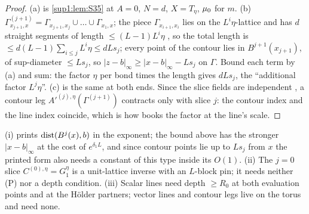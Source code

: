 \begin{proof}
(a) is \cref{sup1:lem:S35} at $A=0$, $N=d$, $X=T_\eta$, $\mu_0$ for $m$. (b) $\Gamma^{(j+1)}_{x_{j+1},x}=\Gamma_{x_{j+1},x_j}\cup\dots\cup\Gamma_{x_1,x}$; the piece $\Gamma_{x_{i+1},x_i}$ lies on the $L^i\eta$-lattice and has $d$ straight segments of length $\le(L-1)L^i\eta$ \cite[(2.1)]{Ba1}, so the total length is $\le d(L-1)\sum_{i\le j}L^i\eta\le dLs_j$; every point of the contour lies in $B^{j+1}(x_{j+1})$, of sup-diameter $\le Ls_j$, so $|z-b|_\infty\ge|x-b|_\infty-Ls_j$ on $\Gamma$. Bound each term by (a) and sum: the factor $\eta$ per bond times the length gives $dLs_j$, the ``additional factor $L^j\eta$''. (c) is the same at both ends. Since the slice fields are independent \cite[p.~414]{Ba3}, a contour leg $A'^{(j),\eta}(\Gamma^{(j+1)})$ contracts only with slice $j$: the contour index and the line index coincide, which is how \cite[(2.14)]{Ba3} books the factor at the line's scale.
\end{proof}

\begin{remark}\label{sup1:rem:S3}
(i) \cite[(2.12)]{Ba3} prints $\operatorname{dist}(B^j(x),b)$ in the exponent; the bound above has the stronger $|x-b|_\infty$ at the cost of $e^{\delta_1L}$, and since contour points lie up to $Ls_j$ from $x$ the printed form also needs a constant of this type inside its $O(1)$. (ii) The $j=0$ slice $C^{(0),\eta}=G^\eta_1$ is a unit-lattice inverse with an $L$-block pin; it needs neither (P) nor a depth condition. (iii) Scalar lines need depth $\ge R_0$ at both evaluation points and at the H\"older partners; vector lines and contour legs live on the torus and need none.
\end{remark}
